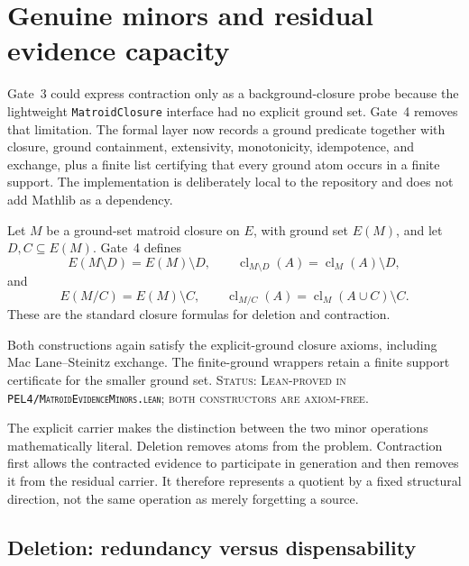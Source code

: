 \section{Genuine minors and residual evidence capacity}
\label{sec:matroid-minors}

Gate~3 could express contraction only as a background-closure probe because the
lightweight \texttt{MatroidClosure} interface had no explicit ground set. Gate~4
removes that limitation. The formal layer now records a ground predicate together
with closure, ground containment, extensivity, monotonicity, idempotence, and
exchange, plus a finite list certifying that every ground atom occurs in a finite
support. The implementation is deliberately local to the repository and does not
add Mathlib as a dependency.

\begin{definition}
Let \(M\) be a ground-set matroid closure on \(E\), with ground set
\(E(M)\), and let \(D,C\subseteq E(M)\). Gate~4 defines
\[
  E(M\setminus D)=E(M)\setminus D,
  \qquad
  \operatorname{cl}_{M\setminus D}(A)
  =\operatorname{cl}_M(A)\setminus D,
\]
and
\[
  E(M/C)=E(M)\setminus C,
  \qquad
  \operatorname{cl}_{M/C}(A)
  =\operatorname{cl}_M(A\cup C)\setminus C.
\]
These are the standard closure formulas for deletion and contraction.
\end{definition}

\begin{theorem}
Both constructions again satisfy the explicit-ground closure axioms, including
Mac Lane--Steinitz exchange. The finite-ground wrappers retain a finite support
certificate for the smaller ground set.
\textup{\textsc{Status: Lean-proved in
\texttt{PEL4/MatroidEvidenceMinors.lean}; both constructors are axiom-free.}}
\end{theorem}

The explicit carrier makes the distinction between the two minor operations
mathematically literal. Deletion removes atoms from the problem. Contraction first
allows the contracted evidence to participate in generation and then removes it
from the residual carrier. It therefore represents a quotient by a fixed structural
direction, not the same operation as merely forgetting a source.

\subsection{Deletion: redundancy versus dispensability}

